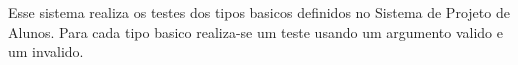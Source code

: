 \-Esse sistema realiza os testes dos tipos basicos definidos no \-Sistema de \-Projeto de \-Alunos. \-Para cada tipo basico realiza-\/se um teste usando um argumento valido e um invalido. 